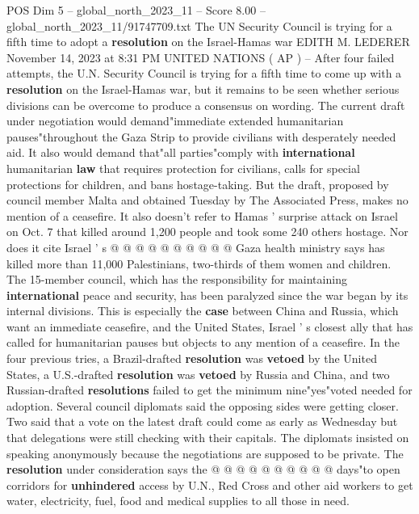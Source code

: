 \begin{textsample}{POS Dim 5 – global\_north\_2023\_11 – Score 8.00 – global\_north\_2023\_11/91747709.txt}  \label{ex:f5_pos_420}
The UN Security Council is trying for a fifth time to adopt a \textbf{resolution} on the Israel-Hamas war EDITH M.
LEDERER November 14, 2023 at 8:31 PM UNITED NATIONS ( AP ) -- After four failed attempts, the U.N.
Security Council is trying for a fifth time to come up with a \textbf{resolution} on the Israel-Hamas war, but it remains to be seen whether serious divisions can be overcome to produce a consensus on wording.
The current draft under negotiation would demand"immediate extended humanitarian pauses"throughout the Gaza Strip to provide civilians with desperately needed aid.
It also would demand that"all parties"comply with \textbf{international} humanitarian \textbf{law} that requires protection for civilians, calls for special protections for children, and bans hostage-taking.
But the draft, proposed by council member Malta and obtained Tuesday by The Associated Press, makes no mention of a ceasefire.
It also doesn't refer to Hamas ' surprise attack on Israel on Oct. 7 that killed around 1,200 people and took some 240 others hostage.
Nor does it cite Israel ' s @ @ @ @ @ @ @ @ @ @ Gaza health ministry says has killed more than 11,000 Palestinians, two-thirds of them women and children.
The 15-member council, which has the responsibility for maintaining \textbf{international} peace and security, has been paralyzed since the war began by its internal divisions.
This is especially the \textbf{case} between China and Russia, which want an immediate ceasefire, and the United States, Israel ' s closest ally that has called for humanitarian pauses but objects to any mention of a ceasefire.
In the four previous tries, a Brazil-drafted \textbf{resolution} was \textbf{vetoed} by the United States, a U.S.-drafted \textbf{resolution} was \textbf{vetoed} by Russia and China, and two Russian-drafted \textbf{resolutions} failed to get the minimum nine"yes"voted needed for adoption.
Several council diplomats said the opposing sides were getting closer.
Two said that a vote on the latest draft could come as early as Wednesday but that delegations were still checking with their capitals.
The diplomats insisted on speaking anonymously because the negotiations are supposed to be private.
The \textbf{resolution} under consideration says the @ @ @ @ @ @ @ @ @ @ days"to open corridors for \textbf{unhindered} access by U.N., Red Cross and other aid workers to get water, electricity, fuel, food and medical supplies to all those in need.

\end{textsample}

